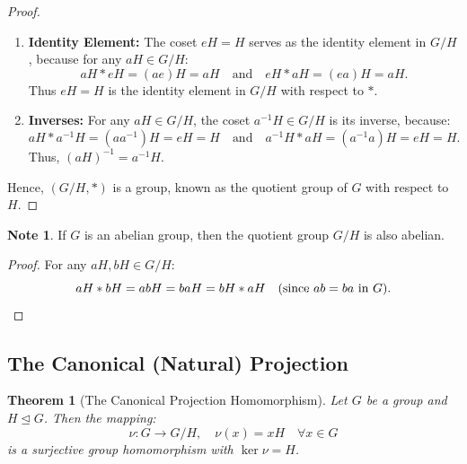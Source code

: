 \documentclass[12pt]{article}
\theoremstyle{definition}
\newtheorem*{note}{Note}
\theoremstyle{plain}
\newtheorem{theorem}{Theorem}[section]
\begin{document}
\begin{proof}
\begin{enumerate}
    \item \textbf{Identity Element:}
    The coset $eH = H$ serves as the identity element in $G/H$, because for any $aH \in G/H$:
    \[
    aH * eH = (ae)H = aH \quad \text{and} \quad eH * aH = (ea)H = aH.
    \]
    Thus $eH = H$ is the identity element in $G/H$ with respect to $*$.
    
    \item \textbf{Inverses:}
    For any $aH \in G/H$, the coset $a^{-1}H \in G/H$ is its inverse, because:
    \[
    aH * a^{-1}H = (aa^{-1})H = eH = H \quad \text{and} \quad a^{-1}H * aH = (a^{-1}a)H = eH = H.
    \]
    Thus, $(aH)^{-1} = a^{-1}H$.
\end{enumerate}
Hence, $(G/H, *)$ is a group, known as the quotient group of $G$ with respect to $H$.
\end{proof}

\begin{note}
If $G$ is an abelian group, then the quotient group $G/H$ is also abelian.
\begin{proof}
For any $aH, bH \in G/H$:
\[
aH * bH = abH = baH = bH * aH \quad (\text{since } ab = ba \text{ in } G). \qedhere
\]
\end{proof}
\end{note}

\subsection{The Canonical (Natural) Projection}

\begin{theorem}[The Canonical Projection Homomorphism]
Let $G$ be a group and $H \trianglelefteq G$. Then the mapping:
\[
\nu: G \to G/H, \quad \nu(x) = xH \quad \forall x \in G
\]
is a surjective group homomorphism with $\ker \nu = H$.
\end{theorem}
\end{document}
